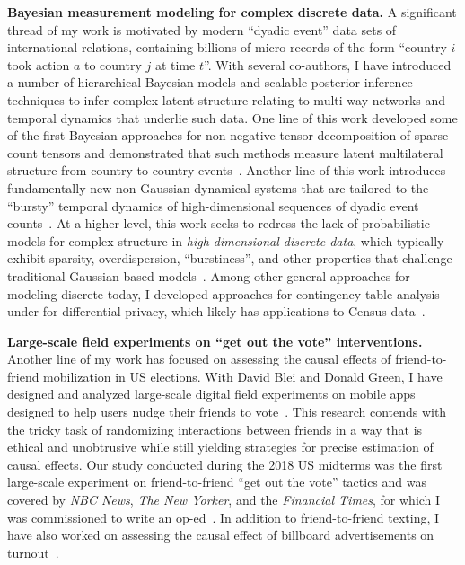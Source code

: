 \documentclass[11pt]{article}
\begin{document}
\textbf{Bayesian measurement modeling for complex discrete data.} A significant thread of my work is motivated by modern ``dyadic event'' data sets of international relations, containing billions of micro-records of the form ``country $i$ took action $a$ to country $j$ at time $t$''. With several co-authors, I have introduced a number of hierarchical Bayesian models and scalable posterior inference techniques to infer complex latent structure relating to multi-way networks and temporal dynamics that underlie such data. One line of this work developed some of the first Bayesian approaches for non-negative tensor decomposition of sparse count tensors and demonstrated that such methods measure latent multilateral structure from country-to-country events~\citep{schein2015bayesian,schein2015networks,schein2016bayesian,hood2024ell_0}. Another line of this work introduces fundamentally new non-Gaussian dynamical systems that are tailored to the ``bursty'' temporal dynamics of high-dimensional sequences of dyadic event counts~\citep{schein2016pgds,schein2019poisson,stoehr2023ordered}. At a higher level, this work seeks to redress the lack of probabilistic models for complex structure in \emph{high-dimensional discrete data}, which typically exhibit sparsity, overdispersion, ``burstiness'', and other properties that challenge traditional Gaussian-based models~\citep{schein2019allocative}. Among other general approaches for modeling discrete today, I developed approaches for contingency table analysis under for differential privacy, which likely has applications to Census data~\citep{schein2019locally}.~

\textbf{Large-scale field experiments on ``get out the vote'' interventions.} Another line of my work has focused on assessing the causal effects of friend-to-friend mobilization in US elections. With David Blei and Donald Green, I have designed and analyzed large-scale digital field experiments on mobile apps designed to help users nudge their friends to vote~\citep{schein2021outvote,schein2021code}. This research contends with the tricky task of randomizing interactions between friends in a way that is ethical and unobtrusive while still yielding strategies for precise estimation of causal effects. Our study conducted during the 2018 US midterms was the first large-scale experiment on friend-to-friend ``get out the vote'' tactics and was covered by \textit{NBC News}, \textit{The New Yorker}, and the \textit{Financial Times}, for which I was commissioned to write an op-ed~\citep{schein2020FT}. In addition to friend-to-friend texting, I have also worked on assessing the causal effect of billboard advertisements on turnout~\citep{green2024billboard}.~
\end{document}
